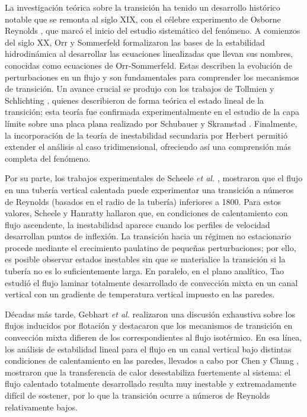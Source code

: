 La investigación teórica sobre la transición ha tenido un desarrollo histórico notable que se remonta al siglo XIX, con el célebre experimento de Osborne Reynolds \cite{reynolds1883}, que marcó el inicio del estudio sistemático del fenómeno. A comienzos del siglo XX, Orr \cite{orr1907} y Sommerfeld \cite{sommerfeld1908} formalizaron las bases de la estabilidad hidrodinámica al desarrollar las ecuaciones linealizadas que llevan sus nombres, conocidas como ecuaciones de Orr-Sommerfeld. Estas describen la evolución de perturbaciones en un flujo y son fundamentales para comprender los mecanismos de transición. Un avance crucial se produjo con los trabajos de Tollmien \cite{tollmien1930} y Schlichting \cite{schlichting1933}, quienes describieron de forma teórica el estado lineal de la transición; esta teoría fue confirmada experimentalmente en el estudio de la capa límite sobre una placa plana realizado por Schubauer y Skramstad \cite{schubauer1947laminar}. Finalmente, la incorporación de la teoría de inestabilidad secundaria por Herbert \cite{herbert1983secondary} permitió extender el análisis al caso tridimensional, ofreciendo así una comprensión más completa del fenómeno.

Por su parte, los trabajos experimentales de Scheele \textit{et al.}  \cite{scheele1960effect}, \cite{scheele1962effect} mostraron que el flujo en una tubería vertical calentada puede experimentar una transición a números de Reynolds (basados en el radio de la tubería) inferiores a 1800. Para estos valores, Scheele y Hanratty \cite{scheele1962effect} hallaron que, en condiciones de calentamiento con flujo ascendente, la inestabilidad aparece cuando los perfiles de velocidad desarrollan puntos de inflexión. La transición hacia un régimen no estacionario procede mediante el crecimiento paulatino de pequeñas perturbaciones; por ello, es posible observar estados inestables sin que se materialice la transición si la tubería no es lo suficientemente larga. En paralelo, en el plano analítico, Tao \cite{tao1960} estudió el flujo laminar totalmente desarrollado de convección mixta en un canal vertical con un gradiente de temperatura vertical impuesto en las paredes.

Décadas más tarde, Gebhart \textit{et al.} \cite{gebhart1989buoyancy} realizaron una discusión exhaustiva sobre los flujos inducidos por flotación y destacaron que los mecanismos de transición en convección mixta difieren de los correspondientes al flujo isotérmico. En esa línea, los análisis de estabilidad lineal para el flujo en un canal vertical bajo distintas condiciones de calentamiento en las paredes, llevados a cabo por Chen y Chung \cite{chen1996linear,chen1998stability}, mostraron que la transferencia de calor desestabiliza fuertemente al sistema: el flujo calentado totalmente desarrollado resulta muy inestable y extremadamente difícil de sostener, por lo que la transición ocurre a números de Reynolds relativamente bajos.

